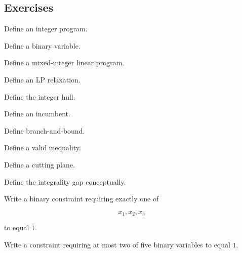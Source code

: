 \subsection{Exercises}
\label{subsec:integer-programming-exercises}

\begin{exercise}[1]
Define an integer program.
\end{exercise}

\begin{exercise}[1]
Define a binary variable.
\end{exercise}

\begin{exercise}[1]
Define a mixed-integer linear program.
\end{exercise}

\begin{exercise}[1]
Define an LP relaxation.
\end{exercise}

\begin{exercise}[1]
Define the integer hull.
\end{exercise}

\begin{exercise}[1]
Define an incumbent.
\end{exercise}

\begin{exercise}[1]
Define branch-and-bound.
\end{exercise}

\begin{exercise}[1]
Define a valid inequality.
\end{exercise}

\begin{exercise}[1]
Define a cutting plane.
\end{exercise}

\begin{exercise}[1]
Define the integrality gap conceptually.
\end{exercise}

\begin{exercise}[2]
Write a binary constraint requiring exactly one of

\[
x_1,x_2,x_3
\]

to equal \(1\).
\end{exercise}

\begin{exercise}[2]
Write a constraint requiring at most two of five binary variables to equal
\(1\).
\end{exercise}

